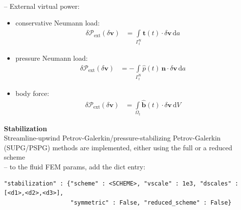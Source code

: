 \documentclass[a4paper,12pt]{report}
\newcommand{\bs}[1]{\boldsymbol{#1}}
\newcommand{\Om}{\mathit{\Omega}}
\newcommand{\Gm}{\mathit{\Gamma}}
\begin{document}
-- External virtual power:\\
\begin{itemize}
\item conservative Neumann load:
\begin{equation}
\label{equation-deltap-ext-cur}
\begin{aligned}
\delta \mathcal{P}_{\mathrm{ext}}(\delta\bs{v}) &= \int\limits_{\Gm_t^{\mathrm{N}}} \hat{\bs{t}}(t) \cdot \delta\bs{v} \,\mathrm{d}a
\end{aligned}
\end{equation}
\item pressure Neumann load:
\begin{equation}
\label{equation-deltap-ext-cur-p}
\begin{aligned}
\delta \mathcal{P}_{\mathrm{ext}}(\delta\bs{v}) &= -\int\limits_{\Gm_t^{\mathrm{N}}} \hat{p}(t)\,\bs{n} \cdot \delta\bs{v} \,\mathrm{d}a
\end{aligned}
\end{equation}
\item body force:
\begin{equation}
\label{equation-deltap-ext-body}
\begin{aligned}
\delta \mathcal{P}_{\mathrm{ext}}(\delta\bs{v}) &= \int\limits_{\Om_t} \hat{\bs{b}}(t) \cdot \delta\bs{v} \,\mathrm{d}V
\end{aligned}
\end{equation}
\end{itemize}

\textbf{Stabilization}\\

Streamline-upwind Petrov-Galerkin/pressure-stabilizing Petrov-Galerkin (SUPG/PSPG) methods are implemented, either using the full or a reduced scheme\\

-- to the fluid FEM params, add the dict entry:

\begin{Verbatim}[breaklines=true]
"stabilization" : {"scheme" : <SCHEME>, "vscale" : 1e3, "dscales" : [<d1>,<d2>,<d3>],
                   "symmetric" : False, "reduced_scheme" : False}
\end{Verbatim}
\end{document}
